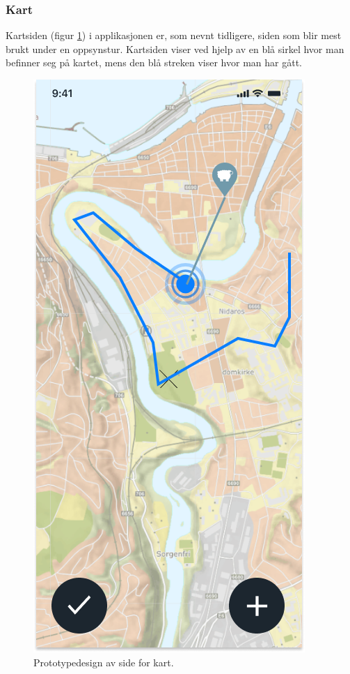 \subsubsection{Kart}
Kartsiden (figur \ref{fig:figma-kart}) i applikasjonen er, som nevnt tidligere, siden som blir mest brukt under en oppsynstur. Kartsiden viser ved hjelp av en blå sirkel hvor man befinner seg på kartet, mens den blå streken viser hvor man har gått.
\begin{figure}[H]
\centering
\captionsetup{width=.8\linewidth}
\includegraphics[scale=0.4]{Figurer/Figma/Frame 2.1 - Oppsynstur-kart.png}
\caption{Prototypedesign av side for kart.}
\label{fig:figma-kart}
\end{figure}

